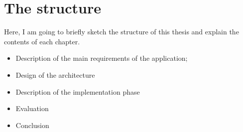 \section{The structure}

Here, I am going to briefly sketch the structure of this thesis and explain the contents of each chapter. 

\begin{itemize}
    \item Description of the main requirements of the application;
    \item Design of the architecture 
    \item Description of the implementation phase
    \item Evaluation
    \item Conclusion
  \end{itemize}